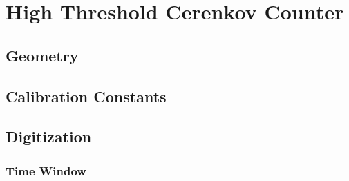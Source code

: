 \section{High Threshold Cerenkov Counter}


\subsection{Geometry}

\subsection{Calibration Constants}


\subsection{Digitization}

\subsubsection{Time Window}


